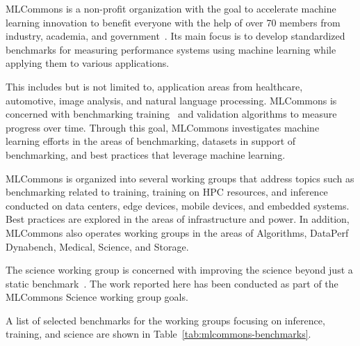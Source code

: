 \documentclass[utf8]{FrontiersinVancouver} %
\begin{document}
MLCommons is a non-profit organization with the goal to accelerate machine learning innovation to benefit everyone with the help of over 70 members from industry, academia, and government~\citep{www-mlcommons}.  Its main focus is to develop standardized benchmarks for measuring performance systems using machine learning while applying them to various applications.

This includes but is not limited to, application areas from healthcare, automotive, image analysis, and natural language processing. MLCommons is concerned with benchmarking training~\citep{mlperf-training} and validation algorithms to measure progress over time. Through this goal, MLCommons investigates machine learning efforts in the areas of benchmarking, datasets in support of benchmarking, and best practices that leverage machine learning.

MLCommons is organized into several working groups that address topics such as benchmarking related to training, training on HPC resources, and inference conducted on data centers, edge devices, mobile devices, and embedded systems. Best practices are explored in the areas of infrastructure and power. In addition, MLCommons also operates working groups in the areas of Algorithms, DataPerf Dynabench, Medical, Science, and Storage.

The science working group is concerned with improving the science beyond just a static benchmark~\citep{las-22-mlcommons-science}.  The work reported here has been conducted as part of the MLCommons Science working group goals.

A list of selected benchmarks for the working groups focusing on inference, training, and science are shown in Table~\ref{tab:mlcommons-benchmarks}.
\end{document}
